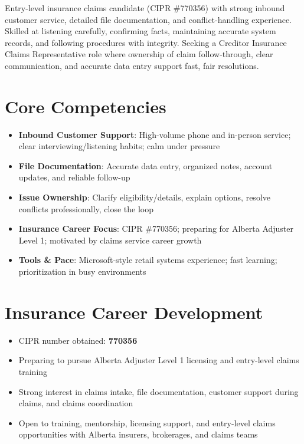 \documentclass[11pt,a4paper,sans]{moderncv}
\begin{document}
\makecvtitle

\vspace{6pt}
\small{Entry-level insurance claims candidate (CIPR \#770356) with strong inbound customer service, detailed file documentation, and conflict-handling experience. Skilled at listening carefully, confirming facts, maintaining accurate system records, and following procedures with integrity. Seeking a Creditor Insurance Claims Representative role where ownership of claim follow-through, clear communication, and accurate data entry support fast, fair resolutions.}

\section{Core Competencies}
\vspace{1pt}
\begin{itemize}
\item \textbf{Inbound Customer Support}: High-volume phone and in-person service; clear interviewing/listening habits; calm under pressure
\item \textbf{File Documentation}: Accurate data entry, organized notes, account updates, and reliable follow-up
\item \textbf{Issue Ownership}: Clarify eligibility/details, explain options, resolve conflicts professionally, close the loop
\item \textbf{Insurance Career Focus}: CIPR \#770356; preparing for Alberta Adjuster Level 1; motivated by claims service career growth
\item \textbf{Tools \& Pace}: Microsoft-style retail systems experience; fast learning; prioritization in busy environments
\end{itemize}

\section{Insurance Career Development}
\vspace{1pt}
\begin{itemize}
\item CIPR number obtained: \textbf{770356}
\item Preparing to pursue Alberta Adjuster Level 1 licensing and entry-level claims training
\item Strong interest in claims intake, file documentation, customer support during claims, and claims coordination
\item Open to training, mentorship, licensing support, and entry-level claims opportunities with Alberta insurers, brokerages, and claims teams
\end{itemize}
\end{document}
